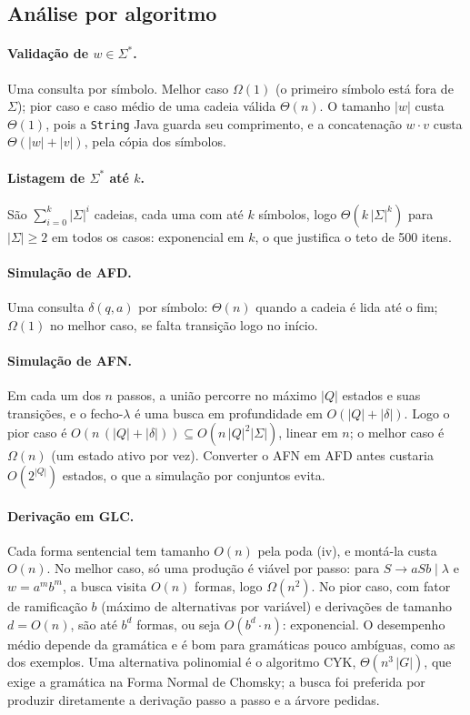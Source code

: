\documentclass[12pt,a4paper]{article}
\newcommand{\cod}[1]{\texttt{#1}}
\newcommand{\lam}{\lambda}
\begin{document}
\subsection{Análise por algoritmo}

\paragraph{Validação de $w \in \Sigma^*$.} Uma consulta por símbolo. Melhor
caso $\Omega(1)$ (o primeiro símbolo está fora de $\Sigma$); pior caso e caso
médio de uma cadeia válida $\Theta(n)$. O tamanho $|w|$ custa $\Theta(1)$, pois
a \cod{String} Java guarda seu comprimento, e a concatenação $w \cdot v$ custa
$\Theta(|w| + |v|)$, pela cópia dos símbolos.

\paragraph{Listagem de $\Sigma^*$ até $k$.} São $\sum_{i=0}^{k} |\Sigma|^i$
cadeias, cada uma com até $k$ símbolos, logo $\Theta(k\,|\Sigma|^k)$ para
$|\Sigma| \ge 2$ em todos os casos: exponencial em $k$, o que justifica o teto
de 500 itens.

\paragraph{Simulação de AFD.} Uma consulta $\delta(q, a)$ por símbolo:
$\Theta(n)$ quando a cadeia é lida até o fim; $\Omega(1)$ no melhor caso, se
falta transição logo no início.

\paragraph{Simulação de AFN.} Em cada um dos $n$ passos, a união percorre no
máximo $|Q|$ estados e suas transições, e o fecho-$\lam$ é uma busca em
profundidade em $O(|Q| + |\delta|)$. Logo o pior caso é
$O(n\,(|Q| + |\delta|)) \subseteq O(n\,|Q|^2|\Sigma|)$, linear em $n$; o melhor
caso é $\Omega(n)$ (um estado ativo por vez). Converter o AFN em AFD antes
custaria $O(2^{|Q|})$ estados, o que a simulação por conjuntos evita.

\paragraph{Derivação em GLC.} Cada forma sentencial tem tamanho $O(n)$ pela poda
(iv), e montá-la custa $O(n)$. No melhor caso, só uma produção é viável por
passo: para $S \to aSb \mid \lam$ e $w = a^mb^m$, a busca visita $O(n)$ formas,
logo $\Omega(n^2)$. No pior caso, com fator de ramificação $b$ (máximo de
alternativas por variável) e derivações de tamanho $d = O(n)$, são até $b^d$
formas, ou seja $O(b^d \cdot n)$: exponencial. O desempenho médio depende da
gramática e é bom para gramáticas pouco ambíguas, como as dos exemplos. Uma
alternativa polinomial é o algoritmo CYK, $\Theta(n^3\,|G|)$, que exige a
gramática na Forma Normal de Chomsky; a busca foi preferida por produzir
diretamente a derivação passo a passo e a árvore pedidas.
\end{document}
